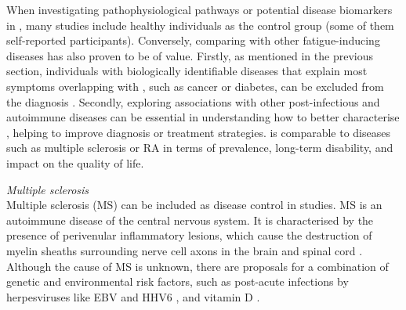 When investigating pathophysiological pathways or potential disease biomarkers in \cfs, many studies include healthy individuals as the control group (some of them self-reported participants).
Conversely, comparing \cfs with other fatigue-inducing diseases has also proven to be of value.
Firstly, as mentioned in the previous section, individuals with biologically identifiable diseases that explain most symptoms overlapping with \cfs, such as cancer or diabetes, can be excluded from the diagnosis \citep{carruthers2003MyalgicEncephalomyelitis}.
Secondly, exploring associations with other post-infectious and autoimmune diseases can be essential in understanding how to better characterise \cfs, helping to improve diagnosis or treatment strategies.
\cfs is comparable to diseases such as multiple sclerosis or RA in terms of prevalence, long-term disability, and impact on the quality of life.

\bsni
\textit{Multiple sclerosis}\\
\noindent
Multiple sclerosis (MS) can be included as disease control in \cfs studies.
MS is an autoimmune disease of the central nervous system.
It is characterised by the presence of perivenular inflammatory lesions, which cause the destruction of myelin sheaths surrounding nerve cell axons in the brain and spinal cord \citep{janeway2017Immunology, dobson2019MultipleSclerosis}.
Although the cause of MS is unknown, there are proposals for a combination of genetic and environmental risk factors, such as post-acute infections by herpesviruses like EBV \citep{handel2010UpdatedMetaanalysis, bjornevik2022LongitudinalAnalysis} and HHV6 \citep{engdahl2019IncreasedSerological}, and vitamin D \citep{dobson2019MultipleSclerosis}.


